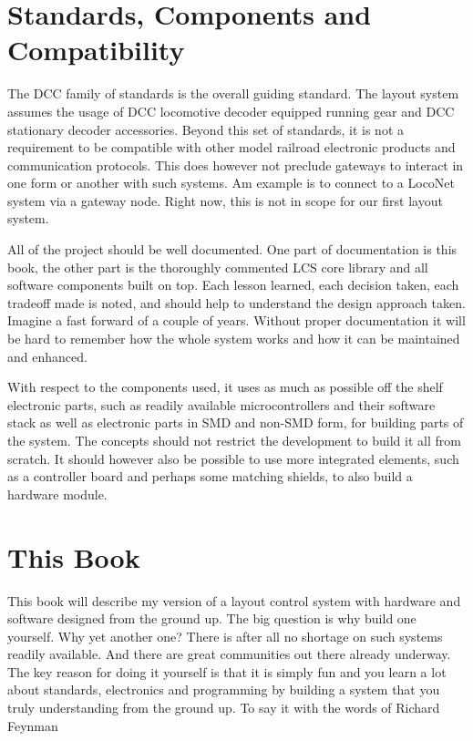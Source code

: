 \section{Standards, Components and Compatibility}

The DCC family of standards is the overall guiding standard. The layout system assumes the usage of DCC locomotive decoder equipped running gear and DCC stationary decoder accessories. Beyond this set of standards, it is not a requirement to be compatible with other model railroad electronic products and communication protocols. This does however not preclude gateways to interact in one form or another with such systems. Am example is to connect to a LocoNet system via a gateway node. Right now, this is not in scope for our first layout system.

All of the project should be well documented. One part of documentation is this book, the other part is the thoroughly commented LCS core library and all software components built on top. Each lesson learned, each decision taken, each tradeoff made is noted, and should help to understand the design approach taken. Imagine a fast forward of a couple of years. Without proper documentation it will be hard to remember how the whole system works and how it can be maintained and enhanced.

With respect to the components used, it uses as much as possible off the shelf electronic parts, such as readily available microcontrollers and their software stack as well as electronic parts in SMD and non-SMD form, for building parts of the system. The concepts should not restrict the development to build it all from scratch. It should however also be possible to use more integrated elements, such as a controller board and perhaps some matching shields, to also build a hardware module.

\section{This Book}

This book will describe my version of a layout control system with hardware and software designed from the ground up. The big question is why build one yourself. Why yet another one? There is after all no shortage on such systems readily available. And there are great communities out there already underway. The key reason for doing it yourself is that it is simply fun and you learn a lot about standards, electronics and programming by building a system that you truly understanding from the ground up. To say it with the words of Richard Feynman

